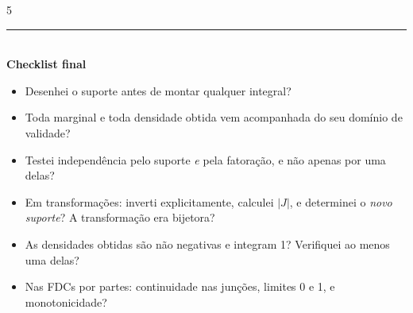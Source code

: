 \documentclass[a4paper,8pt]{extarticle}
\newcommand{\tit}[1]{\vspace{2pt}\textcolor{azul}{\rule{\linewidth}{0.6pt}}\\[1pt]\textbf{\textcolor{azul}{#1}}\\[1pt]}
\begin{document}
\begin{multicols*}{5}
\tit{Checklist final}
\begin{itemize}
\item Desenhei o suporte antes de montar qualquer integral?
\item Toda marginal e toda densidade obtida vem acompanhada do seu domínio de validade?
\item Testei independência pelo suporte \emph{e} pela fatoração, e não apenas por uma delas?
\item Em transformações: inverti explicitamente, calculei $|J|$, e determinei o \emph{novo suporte}? A transformação era bijetora?
\item As densidades obtidas são não negativas e integram 1? Verifiquei ao menos uma delas?
\item Nas FDCs por partes: continuidade nas junções, limites 0 e 1, e monotonicidade?
\end{itemize}

\end{multicols*}
\end{document}
